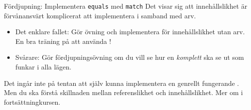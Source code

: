 

\begin{Slide}{Fördjupning: Implementera \texttt{equals} med \texttt{match}}
Det visar sig att innehållslikhet är förvånansvärt komplicerat att implementera i samband med arv.
\begin{itemize}
\item Det enklare fallet: Gör övning  och implementera  för innehållslikhet utan arv. \\ En bra träning på att använda !

\item Svårare: Gör fördjupningsövning  om du vill se hur en \emph{komplett}  ska se ut som funkar i alla lägen.

\end{itemize}

Det ingår inte på tentan att själv kunna implementera en genrellt fungerande . Men du ska förstå skillnaden mellan referenslikhet och innehållslikhet. Mer om  i fortsättningkursen.
\end{Slide}











